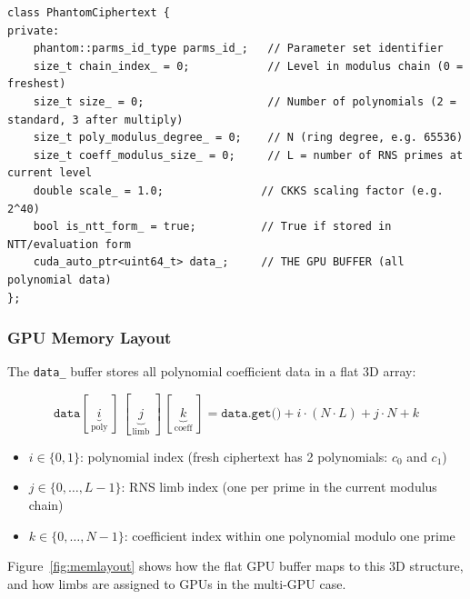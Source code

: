 \documentclass[11pt,letterpaper]{article}
\begin{document}
\begin{lstlisting}[style=cpp, caption=PhantomCiphertext member variables (ciphertext.h)]
class PhantomCiphertext {
private:
    phantom::parms_id_type parms_id_;   // Parameter set identifier
    size_t chain_index_ = 0;            // Level in modulus chain (0 = freshest)
    size_t size_ = 0;                   // Number of polynomials (2 = standard, 3 after multiply)
    size_t poly_modulus_degree_ = 0;    // N (ring degree, e.g. 65536)
    size_t coeff_modulus_size_ = 0;     // L = number of RNS primes at current level
    double scale_ = 1.0;               // CKKS scaling factor (e.g. 2^40)
    bool is_ntt_form_ = true;          // True if stored in NTT/evaluation form
    cuda_auto_ptr<uint64_t> data_;     // THE GPU BUFFER (all polynomial data)
};
\end{lstlisting}

\subsubsection{GPU Memory Layout}

The \texttt{data\_} buffer stores all polynomial coefficient data in a flat 3D array:

\[
\texttt{data}[\,\underbrace{i}_{\text{poly}}\;]\,[\,\underbrace{j}_{\text{limb}}\;]\,[\,\underbrace{k}_{\text{coeff}}\;]
= \texttt{data.get()} + i \cdot (N \cdot L) + j \cdot N + k
\]

\begin{itemize}
  \item $i \in \{0, 1\}$: polynomial index (fresh ciphertext has 2 polynomials: $c_0$ and $c_1$)
  \item $j \in \{0, \ldots, L-1\}$: RNS limb index (one per prime in the current modulus chain)
  \item $k \in \{0, \ldots, N-1\}$: coefficient index within one polynomial modulo one prime
\end{itemize}

Figure~\ref{fig:memlayout} shows how the flat GPU buffer maps to this 3D structure, and how
limbs are assigned to GPUs in the multi-GPU case.
\end{document}

